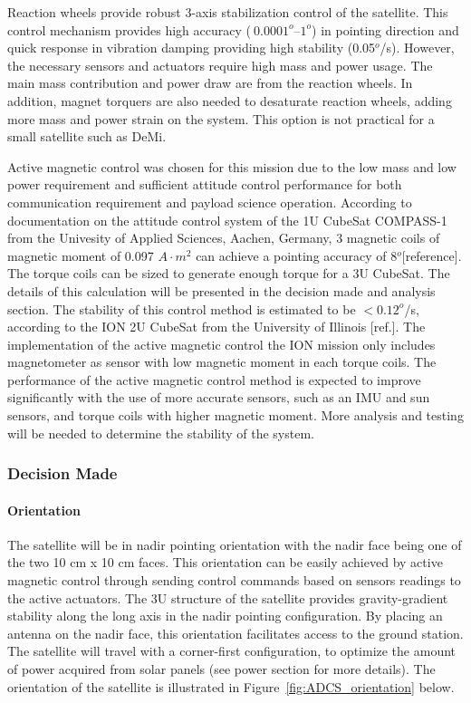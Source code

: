 \documentclass[12pt]{article}
\begin{document}
Reaction wheels provide robust 3-axis stabilization control of the satellite. This control mechanism provides high accuracy ($~ 0.0001^o – 1^o$) in pointing direction and quick response in vibration damping providing high stability (0.05$^o$/s). However, the necessary sensors and actuators require high mass and power usage. The main mass contribution and power draw are from the reaction wheels. In addition, magnet torquers are also needed to desaturate reaction wheels, adding more mass and power strain on the system. This option is not practical for a small satellite such as DeMi. 

Active magnetic control was chosen for this mission due to the low mass and low power requirement and sufficient attitude control performance for both communication requirement and payload science operation. According to documentation on the attitude control system of the 1U CubeSat COMPASS-1 from the Univesity of Applied Sciences, Aachen, Germany, 3 magnetic coils of magnetic moment of  0.097 $A \cdot m^2$ can achieve a pointing accuracy of 8$^o$[reference]. The torque coils can be sized to generate enough torque for a 3U CubeSat. The details of this calculation will be presented in the decision made and analysis section. The stability of this control method is estimated to be $< 0.12^o$/s, according to the ION 2U CubeSat from the University of Illinois [ref.]. The implementation of the active magnetic control the ION mission only includes magnetometer as sensor with low magnetic moment in each torque coils. The performance of the active magnetic control method is expected to improve significantly with the use of more accurate sensors, such as an IMU and sun sensors, and torque coils with higher magnetic moment. More analysis and testing will be needed to determine the stability of the system. 
			\subsubsection{Decision Made}
				\paragraph{Orientation}
				The satellite will be in nadir pointing orientation with the nadir face being one of the two 10 cm x 10 cm faces. This orientation can be easily achieved by active magnetic control through sending control commands based on sensors readings to the active actuators. The 3U structure of the satellite provides gravity-gradient stability along the long axis in the nadir pointing configuration. By placing an antenna on the nadir face, this orientation facilitates access to the ground station. The satellite will travel with a corner-first configuration, to optimize the amount of power acquired from solar panels (see power section for more details). The orientation of the satellite is illustrated in Figure~\ref{fig:ADCS_orientation} below. 
			
\end{document}
